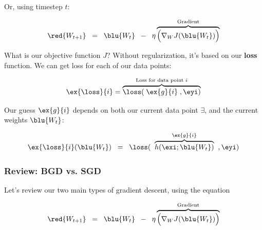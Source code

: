             Or, using timestep $t$:
            
            \begin{equation}
                \red{ W_{t+1} } 
                \;\;=\;\;
                \blu{ W_t }
                \;\;-\;\;
                \eta
                \overbrace{
                    \Big(
                        \nabla_W J ( \blu{ W_t } )
                    \Big)
                }^{\text{Gradient}}
            \end{equation}
            
            What is our objective function $J$? Without regularization, it's based on our \textbf{loss} function. We can get loss for each of our data points:
            
            \begin{equation}
                \ex{\loss}{i}
                =
                \overbrace{
                    \loss(
                    \; \ex{g}{i} \;
                    ,\eyi
                    )
                }^{\text{Loss for data point $i$}}
            \end{equation}
            
            Our guess $\ex{g}{i}$ depends on both our current data point $\exi$, and the current weights $\blu{ W_t }$:
            
            \begin{equation}
                \ex{\loss}{i}(\blu{ W_t })
                \;\;=\;\;
                \loss(
                \;\;
                \overbrace{
                     h(\exi;\blu{ W_t }) 
                }^{\ex{g}{i}}
                \;\;
                ,\eyi
                )
            \end{equation}
    
        \phantom{}
    
        \subsubsection{Review: BGD vs. SGD}
        
            Let's review our two main types of gradient descent, using the equation
            
            \begin{equation}
                \red{ W_{t+1} } 
                \;\;=\;\;
                \blu{ W_t }
                \;\;-\;\;
                \eta
                \overbrace{
                    \Big(
                        \nabla_W J ( \blu{ W_t } )
                    \Big)
                }^{\text{Gradient}}
            \end{equation}
            
